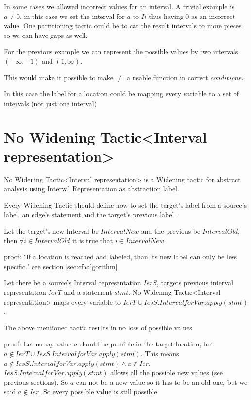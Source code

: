 In some cases we allowed incorrect values for an interval. A trivial example is $a \neq 0$. in this case we set the interval for $a$ to $Ii$ thus having $0$ as an incorrect value. One partitioning tactic could be to cat the result intervals to more pieces so we can have gaps as well.

For the previous example we can represent the possible values by two intervals $(-\infty, -1)$ and $(1, \infty)$.

This would make it possible to make $\neq$ a usable function in correct $condition$s.

In this case the label for a location could be mapping every variable to a set of intervals (not just one interval)

\section{No Widening Tactic<Interval representation>}

\begin{definition}
	No Widening Tactic<Interval representation> is a Widening tactic for abstract analysis using Interval Representation as abstraction label.
\end{definition}

Every Widening Tactic should define how to set the target's label from a source's label, an edge's statement and the target's previous label.

\begin{theorem}
	Let the target's new Interval be $IntervalNew$ and the previous be $IntervalOld$, then $\forall i \in IntervalOld$ it is true that $i \in  IntervalNew$.
\end{theorem}
{proof: } "If a location is reached and labeled, than its new label can only be less specific." see section \ref{sec:cfaalgorithm}

Let there be a source's Interval representation $IerS$, targets previous interval representation $IerT$ and a statement $stmt$. No Widening Tactic<Interval representation> maps every variable to $IerT \cup IesS.IntervalforVar.apply(stmt)$.

\begin{theorem}
	The above mentioned tactic results in no loss of possible values
\end{theorem}
{proof: } Let us say value $a$ should be possible in the target location, but $a \notin IerT \cup IesS.IntervalforVar.apply(stmt)$. This means $a \notin IesS.IntervalforVar.apply(stmt) \land a \notin Ier$. $IesS.IntervalforVar.apply(stmt)$ allows all the possible new values (see previous sections). So $a$ can not be a new value so it has to be an old one, but we said $a \notin Ier$. So every possible value is still possible
 

